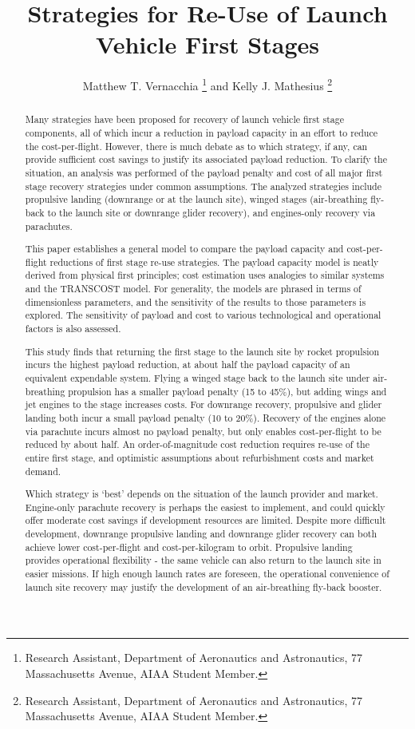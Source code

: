 \documentclass[conf]{new-aiaa}
\title{Strategies for Re-Use of Launch Vehicle First Stages}
\author{Matthew T. Vernacchia \footnote{Research Assistant, Department of Aeronautics and Astronautics, 77 Massachusetts Avenue, AIAA Student Member.}
and Kelly J. Mathesius  \footnote{Research Assistant, Department of Aeronautics and Astronautics, 77 Massachusetts Avenue, AIAA Student Member.}}
\affil{Massachusetts Institute of Technology, Cambridge, MA, 02139}
\begin{document}
\maketitle

\begin{abstract}
Many strategies have been proposed for recovery of launch vehicle first stage components, all of which incur a reduction in payload capacity in an effort to reduce the cost-per-flight.
However, there is much debate as to which strategy, if any, can provide sufficient cost savings to justify its associated payload reduction. To clarify the situation, an analysis was performed of the payload penalty and cost of all major first stage recovery strategies under common assumptions. The analyzed strategies include propulsive landing (downrange or at the launch site), winged stages (air-breathing fly-back to the launch site or downrange glider recovery), and engines-only recovery via parachutes.

This paper establishes a general model to compare the payload capacity and cost-per-flight reductions of first stage re-use strategies.
The payload capacity model is neatly derived from physical first principles; cost estimation uses analogies to similar systems and the TRANSCOST model. For generality, the models are phrased in terms of dimensionless parameters, and the sensitivity of the results to those parameters is explored.
The sensitivity of payload and cost to various technological and operational factors is also assessed.

This study finds that returning the first stage to the launch site by rocket propulsion incurs the highest payload reduction, at about half the payload capacity of an equivalent expendable system.  Flying a winged stage back to the launch site under air-breathing propulsion has a smaller payload penalty (15 to 45\%), but adding wings and jet engines to the stage increases costs. For downrange recovery, propulsive and glider landing both incur a small payload penalty  (10 to 20\%). Recovery of the engines alone via parachute incurs almost no payload penalty, but only enables cost-per-flight to be reduced by about half. An order-of-magnitude cost reduction requires re-use of the entire first stage, and optimistic assumptions about refurbishment costs and market demand.

Which strategy is `best' depends on the situation of the launch provider and market. Engine-only parachute recovery is perhaps the easiest to implement, and could quickly offer moderate cost savings if development resources are limited. Despite more difficult development, downrange propulsive landing and downrange glider recovery can both achieve lower cost-per-flight and cost-per-kilogram to orbit. Propulsive landing provides operational flexibility - the same vehicle can also return to the launch site in easier missions. If high enough launch rates are foreseen, the operational convenience of launch site recovery may justify the development of an air-breathing fly-back booster.

\end{abstract}
\end{document}
